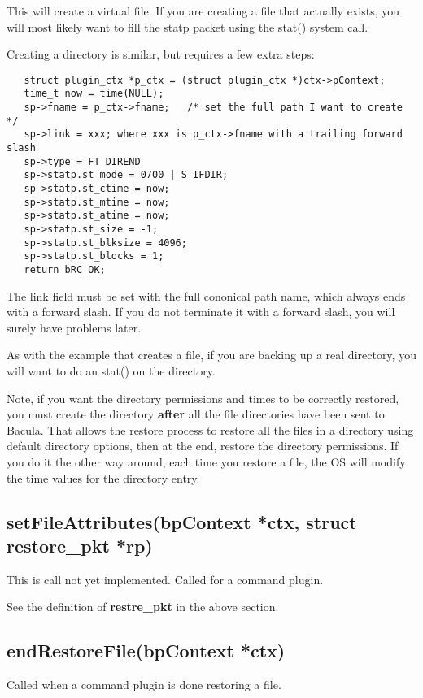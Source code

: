 This will create a virtual file.  If you are creating a file that actually 
exists, you will most likely want to fill the statp packet using the
stat() system call.

Creating a directory is similar, but requires a few extra steps:

\begin{verbatim}
   struct plugin_ctx *p_ctx = (struct plugin_ctx *)ctx->pContext;
   time_t now = time(NULL);
   sp->fname = p_ctx->fname;   /* set the full path I want to create */
   sp->link = xxx; where xxx is p_ctx->fname with a trailing forward slash
   sp->type = FT_DIREND
   sp->statp.st_mode = 0700 | S_IFDIR;
   sp->statp.st_ctime = now;
   sp->statp.st_mtime = now;
   sp->statp.st_atime = now;
   sp->statp.st_size = -1;
   sp->statp.st_blksize = 4096;
   sp->statp.st_blocks = 1;
   return bRC_OK;
\end{verbatim}

The link field must be set with the full cononical path name, which always 
ends with a forward slash.  If you do not terminate it with a forward slash,
you will surely have problems later.

As with the example that creates a file, if you are backing up a real
directory, you will want to do an stat() on the directory.  

Note, if you want the directory permissions and times to be correctly
restored, you must create the directory {\bf after} all the file directories
have been sent to Bacula. That allows the restore process to restore all the
files in a directory using default directory options, then at the end, restore
the directory permissions.  If you do it the other way around, each time you
restore a file, the OS will modify the time values for the directory entry.

\subsection{setFileAttributes(bpContext *ctx, struct restore\_pkt *rp)}
This is call not yet implemented.  Called for a command plugin.

See the definition of {\bf restre\_pkt} in the above section.

\subsection{endRestoreFile(bpContext *ctx)}
Called when a command plugin is done restoring a file.

